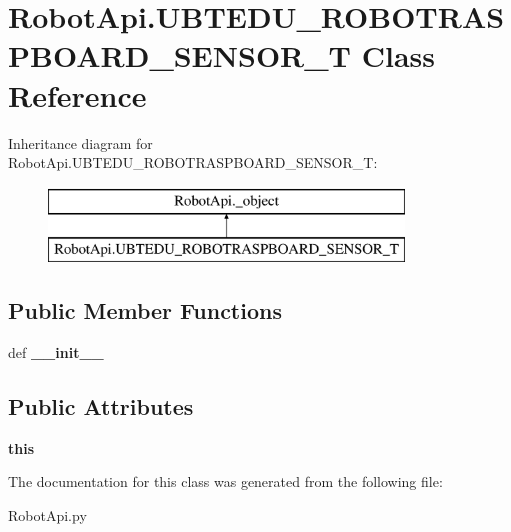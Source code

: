 \hypertarget{classRobotApi_1_1UBTEDU__ROBOTRASPBOARD__SENSOR__T}{\section{Robot\+Api.\+U\+B\+T\+E\+D\+U\+\_\+\+R\+O\+B\+O\+T\+R\+A\+S\+P\+B\+O\+A\+R\+D\+\_\+\+S\+E\+N\+S\+O\+R\+\_\+\+T Class Reference}
\label{classRobotApi_1_1UBTEDU__ROBOTRASPBOARD__SENSOR__T}
}
Inheritance diagram for Robot\+Api.\+U\+B\+T\+E\+D\+U\+\_\+\+R\+O\+B\+O\+T\+R\+A\+S\+P\+B\+O\+A\+R\+D\+\_\+\+S\+E\+N\+S\+O\+R\+\_\+\+T\+:\begin{figure}[H]
\begin{center}
\leavevmode
\includegraphics[height=2.000000cm]{classRobotApi_1_1UBTEDU__ROBOTRASPBOARD__SENSOR__T}
\end{center}
\end{figure}
\subsection*{Public Member Functions}
\begin{DoxyCompactItemize}
\item 
\hypertarget{classRobotApi_1_1UBTEDU__ROBOTRASPBOARD__SENSOR__T_a83d482f7d2ef8538211ca356d190ce92}{def {\bfseries \+\_\+\+\_\+init\+\_\+\+\_\+}}\label{classRobotApi_1_1UBTEDU__ROBOTRASPBOARD__SENSOR__T_a83d482f7d2ef8538211ca356d190ce92}

\end{DoxyCompactItemize}
\subsection*{Public Attributes}
\begin{DoxyCompactItemize}
\item 
\hypertarget{classRobotApi_1_1UBTEDU__ROBOTRASPBOARD__SENSOR__T_abee597ebf9d71c1e75580f10a452b662}{{\bfseries this}}\label{classRobotApi_1_1UBTEDU__ROBOTRASPBOARD__SENSOR__T_abee597ebf9d71c1e75580f10a452b662}

\end{DoxyCompactItemize}


The documentation for this class was generated from the following file\+:\begin{DoxyCompactItemize}
\item 
Robot\+Api.\+py\end{DoxyCompactItemize}
